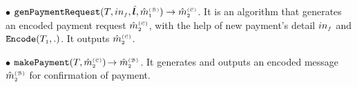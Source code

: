 \begin{definition}
%
\item  [$\bullet$] $\mathtt{genPaymentRequest}(T, in_{\scriptscriptstyle f}, \hat{\bm{l}}, \hat m^{\scriptscriptstyle\mathcal{(B)}}_{\scriptscriptstyle1})\rightarrow \hat m^{\scriptscriptstyle\mathcal{(C)}}_{\scriptscriptstyle2}$. It is an algorithm that generates an encoded payment request  $\hat m^{\scriptscriptstyle\mathcal{(C)}}_{\scriptscriptstyle2}$, with the help of new payment's detail $in_{\scriptscriptstyle f}$ and $\mathtt{Encode}(T_{\scriptscriptstyle 1},.)$. It outputs  $\hat m^{\scriptscriptstyle\mathcal{(C)}}_{\scriptscriptstyle2}$.  
%
\item  [$\bullet$] $\mathtt{makePayment}(T, \hat m^{\scriptscriptstyle\mathcal{(C)}}_{\scriptscriptstyle2})\hspace{-.5mm}\rightarrow \hat m^{\scriptscriptstyle\mathcal{(B)}}_{\scriptscriptstyle2}$. It  generates and outputs an encoded message $\hat m^{\scriptscriptstyle\mathcal{(B)}}_{\scriptscriptstyle2}$ for confirmation of payment. 
%


 

\end{definition}

